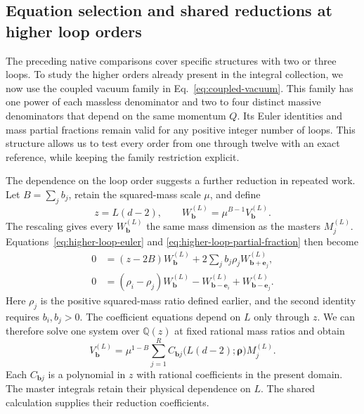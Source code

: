 \subsection{Equation selection and shared reductions at higher loop orders}
\label{sec:higher-loop-acceleration}
The preceding native comparisons cover specific structures with two or three loops. To study the higher orders already present in the integral
collection, we now use the coupled vacuum family in
Eq.~\eqref{eq:coupled-vacuum}. This family has one power of each massless
denominator and two to four distinct massive denominators that depend on
the same momentum \(Q\). Its Euler identities and mass partial fractions
remain valid for any positive integer number of loops. This structure
allows us to test every order from one through twelve with an exact
reference, while keeping the family restriction explicit.

The dependence on the loop order suggests a further reduction in repeated
work. Let \(B=\sum_j b_j\), retain the squared-mass scale \(\mu\), and define
\begin{equation}
 z=L(d-2),\qquad
 W^{(L)}_{\boldsymbol b}=\mu^{B-1}V^{(L)}_{\boldsymbol b}.
 \label{eq:loop-shared-variable}
\end{equation}
The rescaling gives every \(W^{(L)}_{\boldsymbol b}\) the same mass dimension
as the masters \(M_j^{(L)}\). Equations~\eqref{eq:higher-loop-euler} and
\eqref{eq:higher-loop-partial-fraction} then become
\begin{align}
 0&=(z-2B)W^{(L)}_{\boldsymbol b}
       +2\sum_j b_j\rho_j W^{(L)}_{\boldsymbol b+\boldsymbol e_j},
 \label{eq:loop-shared-euler}\\
 0&=(\rho_i-\rho_j)W^{(L)}_{\boldsymbol b}
       -W^{(L)}_{\boldsymbol b-\boldsymbol e_i}
       +W^{(L)}_{\boldsymbol b-\boldsymbol e_j}.
 \label{eq:loop-shared-mass}
\end{align}
Here \(\rho_j\) is the positive squared-mass ratio defined earlier, and the
second identity requires \(b_i,b_j>0\).
The coefficient equations depend on \(L\) only through \(z\). We can
therefore solve one system over \(\mathbb Q(z)\) at fixed rational mass
ratios and obtain
\begin{equation}
 V^{(L)}_{\boldsymbol b}
 =\mu^{1-B}\sum_{j=1}^{R}
 C_{\boldsymbol b j}\bigl(L(d-2);\boldsymbol\rho\bigr)M_j^{(L)}.
 \label{eq:loop-shared-result}
\end{equation}
Each \(C_{\boldsymbol b j}\) is a polynomial in \(z\) with rational
coefficients in the present domain. The master integrals retain their
physical dependence on \(L\). The shared calculation supplies their
reduction coefficients.

